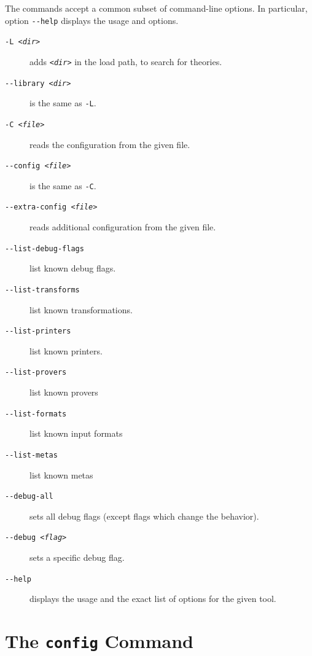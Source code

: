 The commands accept a common subset of command-line options. In
particular, option \verb|--help| displays the usage and options.
\begin{description}
\item[\texttt{-L \textsl{<dir>}}]
  adds \texttt{\textsl{<dir>}} in the load path, to search for theories.
\item[\texttt{-{}-library \textsl{<dir>}}]
  is the same as \verb|-L|.
\item[\texttt{-C \textsl{<file>}}]
  reads the configuration from the given file.
\item[\texttt{-{}-config \textsl{<file>}}]
  is the same as \verb|-C|.
\item[\texttt{-{}-extra-config \textsl{<file>}}]
  reads additional configuration from the given file.
\item[\texttt{-{}-list-debug-flags}]
    list known debug flags.
\item[\texttt{-{}-list-transforms}]
    list known transformations.
\item[\texttt{-{}-list-printers}]
  list known printers.
\item[\texttt{-{}-list-provers}]
  list known provers
\item[\texttt{-{}-list-formats}]
  list known input formats
\item[\texttt{-{}-list-metas}]
  list known metas
\item[\texttt{-{}-debug-all}]
  sets all debug flags (except flags which change the behavior).
\item[\texttt{-{}-debug \textsl{<flag>}}]
  sets a specific debug flag.
\item[\texttt{-{}-help}]
  displays the usage and the exact list of options for the given tool.
\end{description}

\section{The \texttt{config} Command}
\label{sec:why3config}

